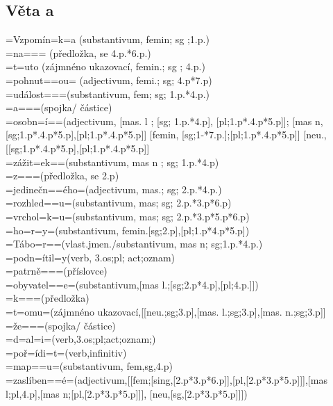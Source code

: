 \documentclass[12pt,a4paper]{article}
\theoremstyle{definition}
\begin{document}
\subsection{V\v{e}ta a}
=Vzpom\'{i}n=k=a (substantivum, femin; sg ;1.p.) \\
=na=== (p\v{r}edlo\v{z}ka, se 4.p.*6.p.) \\
=t=uto (z\'{a}jmn\'{e}no ukazovac\'{i}, femin.; sg ; 4.p.) \\
=pohnut==ou= (adjectivum, femi.; sg; 4.p*7.p) \\
=ud\'{a}lost===(substantivum, fem; sg; 1.p.*4.p.) \\
=a===(spojka/ \v{c}\'{a}stice) \\
=osobn=\'{i}==(adjectivum, [mas. l ; [sg; 1.p.*4.p], [pl;1.p*.4.p*5.p]]; 
[mas n, [sg;1.p*.4.p*5.p],[pl;1.p*.4.p*5.p]] 
[femin, [sg;1-*7.p.];[pl;1.p*.4.p*5.p]] 
[neu., [[sg;1.p*.4.p*5.p],[pl;1.p*.4.p*5.p]] \\
=z\'{a}\v{z}it=ek==(substantivum, mas n ; sg; 1.p.*4.p)\\
=z===(p\v{r}edlo\v{z}ka, se 2.p)\\
=jedine\v{c}n==\'{e}ho=(adjectivum, mas.; sg; 2.p.*4.p.) \\
=rozhled==u=(substantivum, mas; sg; 2.p.*3.p*6.p)\\
=vrchol=k=u=(substantivum, mas; sg; 2.p.*3.p*5.p*6.p)\\
=ho=r=y=(substantivum, femin.[sg;2.p],[pl;1.p*4.p*5.p])\\
=T\'{a}bo=r==(vlast.jmen./substantivum, mas n; sg;1.p.*4.p.) \\
=podn=\'{i}til=y(verb, 3.os;pl; act;oznam) \\
=patrn\v{e}===(p\v{r}\'{i}slovce) \\
=obyvatel==e=(substantivum,[mas l.;[sg;2.p*4.p],[pl;4.p.]]) \\
=k===(p\v{r}edlo\v{z}ka) \\
=t=omu=(z\'{a}jmn\'{e}no ukazovac\'{i},[[neu.;sg;3.p],[mas. l.;sg;3.p],[mas. n.;sg;3.p]] \\
=\v{z}e===(spojka/ \v{c}\'{a}stice) \\
=d=al=i=(verb,3.os;pl;act;oznam;) \\
=po\v{r}=\'{i}di=t=(verb,infinitiv) \\
=map==u=(substantivum, fem,sg,4.p) \\
=zasl\'{i}ben==\'{e}=(adjectivum,[[fem;[sing,[2.p*3.p*6.p]],[pl,[2.p*3.p*5.p]]],[mas l;pl,4.p],[mas n;[pl,[2.p*3.p*5.p]]], [neu,[sg,[2.p*3.p*5.p]]]) \\
\end{document}
